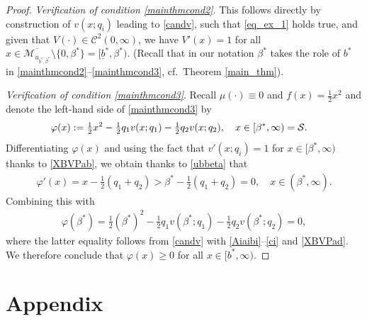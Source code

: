 \documentclass[11pt]{article} %
\renewcommand{\phi}{\varphi}
\def\ub{\underline{b}}
\numberwithin{komcounter}{section}
\newcommand{\ol}{\overline}
\begin{document}
\begin{proof}
\vspace{1mm}
{\it Verification of condition \eqref{mainthmcond2}}. 
This follows directly by construction of $v(x;q_i)$ leading to \eqref{candv}, such that \eqref{eq_ex_1} holds true, and given that $V(\cdot) \in \mathcal{C}^2(0,\infty)$, we have $V'(x) = 1$ for all $x \in \ol{\mathcal{M}_{u_{\ub^*,\beta^*}}} \setminus \{0,\beta^*\} = [\ub^*,\beta^*)$. 
(Recall that in our notation $\beta^*$ takes the role of $b^*$ in \eqref{mainthmcond2}--\eqref{mainthmcond3}, cf.~Theorem \ref{main_thm}).  


\vspace{1mm}
{\it Verification of condition \eqref{mainthmcond3}}.
Recall $\mu(\cdot) \equiv 0$ and $f(x)=\frac12 x^2$ and denote the left-hand side of \eqref{mainthmcond3} by
\begin{align*}
\phi(x)
& :=\tfrac{1}{2} x^2 - \tfrac{1}{2} q_1 v(x;q_1) - \tfrac{1}{2} q_2 v(x;q_2) , 
\quad x\in [\beta^*,\infty) = \cal S.
\end{align*}
Differentiating $\phi(x)$ and using the fact that $v'(x;q_i) = 1$ for $x\in[\beta^*,\infty)$ thanks to \eqref{XBVPab}, we obtain thanks to \eqref{ubbeta} that 
\begin{align*}
\phi'(x) = x - \tfrac12 (q_1+q_2) > \beta^* - \tfrac12 (q_1+q_2) = 0, 
\quad x\in (\beta^*,\infty).
\end{align*}
Combining this with 
\begin{align*}
\phi(\beta^*) 
= \tfrac{1}{2} (\beta^*)^2 - \tfrac{1}{2} q_1 v(\beta^*;q_1) - \tfrac{1}{2} q_2 v(\beta^*;q_2) 
= 0,
\end{align*}
where the latter equality follows from \eqref{candv} with \eqref{Aiaibi}--\eqref{ci} and \eqref{XBVPad}. 
We therefore conclude that $\phi(x) \geq 0$ for all $x \in [b^*,\infty)$.
\end{proof}










 


\appendix
\section{Appendix}
\end{document}
